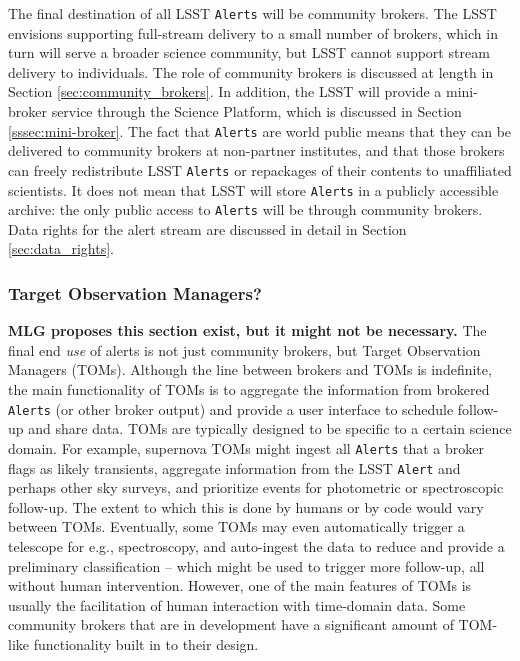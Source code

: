 The final destination of all LSST {\tt Alerts} will be community brokers. The LSST envisions supporting full-stream delivery to a small number of brokers, which in turn will serve a broader science community, but LSST cannot support stream delivery to individuals. The role of community brokers is discussed at length in Section \ref{sec:community_brokers}. In addition, the LSST will provide a mini-broker service through the Science Platform, which is discussed in Section \ref{sssec:mini-broker}. The fact that {\tt Alerts} are world public means that they can be delivered to community brokers at non-partner institutes, and that those brokers can freely redistribute LSST {\tt Alerts} or repackages of their contents to unaffiliated scientists. It does not mean that LSST will store {\tt Alerts} in a publicly accessible archive: the only public access to {\tt Alerts} will be through community brokers. Data rights for the alert stream are discussed in detail in Section \ref{sec:data_rights}.

\subsubsection{Target Observation Managers?}

{\bf MLG proposes this section exist, but it might not be necessary.}  The final end {\em use} of alerts is not just community brokers, but Target Observation Managers (TOMs). Although the line between brokers and TOMs is indefinite, the main functionality of TOMs is to aggregate the information from brokered {\tt Alerts} (or other broker output) and provide a user interface to schedule follow-up and share data. TOMs are typically designed to be specific to a certain science domain. For example, supernova TOMs might ingest all {\tt Alerts} that a broker flags as likely transients, aggregate information from the LSST {\tt Alert} and perhaps other sky surveys, and prioritize events for photometric or spectroscopic follow-up. The extent to which this is done by humans or by code would vary between TOMs. Eventually, some TOMs may even automatically trigger a telescope for e.g., spectroscopy, and auto-ingest the data to reduce and provide a preliminary classification -- which might be used to trigger more follow-up, all without human intervention. However, one of the main features of TOMs is usually the facilitation of human interaction with time-domain data. Some community brokers that are in development have a significant amount of TOM-like functionality built in to their design. 


